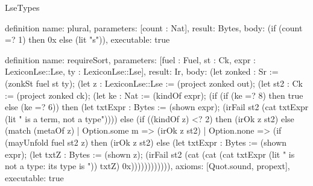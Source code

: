 \begin{lexlean}{LseTypes}
\begin{semanticmodule}
definition{
  name: plural,
  parameters: [count : Nat],
  result: Bytes,
  body: (if (count =? 1) then 0x else (lit "s")),
  executable: true
}

definition{
  name: requireSort,
  parameters: [fuel : Fuel, st : Ck, expr : LexiconLse::Lse, ty : LexiconLse::Lse],
  result: Ir,
  body: (let zonked : Sr := (zonkSt fuel st ty); (let z : LexiconLse::Lse := (project zonked out); (let st2 : Ck := (project zonked ck); (let ke : Nat := (kindOf expr); (if (if (ke =? 8) then true else (ke =? 6)) then (let txtExpr : Bytes := (shown expr); (irFail st2 (cat txtExpr (lit " is a term, not a type")))) else (if ((kindOf z) <? 2) then (irOk z st2) else (match (metaOf z)
    | Option.some m => (irOk z st2)
    | Option.none => (if (mayUnfold fuel st2 z) then (irOk z st2) else (let txtExpr : Bytes := (shown expr); (let txtZ : Bytes := (shown z); (irFail st2 (cat (cat (cat txtExpr (lit " is not a type: its type is ")) txtZ) 0x)))))))))))),
  axioms: [Quot.sound, propext],
  executable: true
}


\end{semanticmodule}
\end{lexlean}

